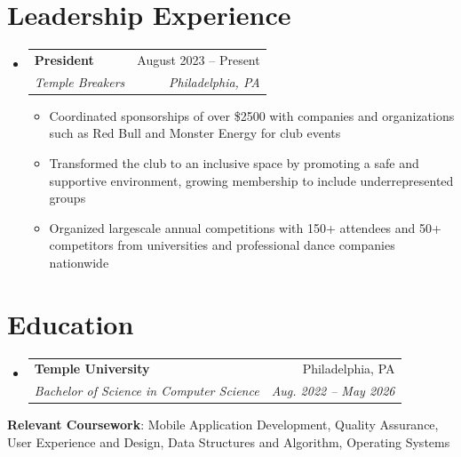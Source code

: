 \documentclass[letterpaper,11pt]{article}
\makeatletter
\newcommand{\resumeItem}[1]{
  \item\small{
    {#1 \vspace{-2pt}}
  }
}
\newcommand{\resumeSubheading}[4]{
  \vspace{-2pt}\item
    \begin{tabular*}{0.97\textwidth}[t]{l@{\extracolsep{\fill}}r}
      \textbf{#1} & #2 \\
      \textit{\small#3} & \textit{\small #4} \\
    \end{tabular*}\vspace{-7pt}
}
\newcommand{\resumeSubHeadingListStart}{\begin{itemize}[leftmargin=0.15in, label={}]}
\newcommand{\resumeSubHeadingListEnd}{\end{itemize}}
\newcommand{\resumeItemListStart}{\begin{itemize}}
\newcommand{\resumeItemListEnd}{\end{itemize}\vspace{-5pt}}
\makeatother
\begin{document}
\section{Leadership Experience}
  \resumeSubHeadingListStart
    \resumeSubheading
          {President}{August 2023 -- Present}
          {Temple Breakers}{Philadelphia, PA}
          \resumeItemListStart
            \resumeItem{Coordinated sponsorships of over \$2500 with companies and organizations such as Red Bull and Monster Energy for club events}
            \resumeItem{Transformed the club to an inclusive space by promoting a safe and supportive environment, growing membership to include underrepresented groups}
            \resumeItem{Organized largescale annual competitions with 150+ attendees and 50+ competitors from universities and professional dance companies nationwide}
          \resumeItemListEnd
  \resumeSubHeadingListEnd

  

\section{Education}
  \resumeSubHeadingListStart
    \resumeSubheading
      {Temple University}{Philadelphia, PA}
      {Bachelor of Science in Computer Science}{Aug. 2022 -- May 2026}
  \resumeSubHeadingListEnd
  \begin{itemize}[leftmargin=0.15in, label={}]
    \small{\item{
     \textbf{Relevant Coursework}{: Mobile Application Development, Quality Assurance, User Experience and Design, Data Structures and Algorithm, Operating Systems} \\
    }}
 \end{itemize}

%



\end{document}
